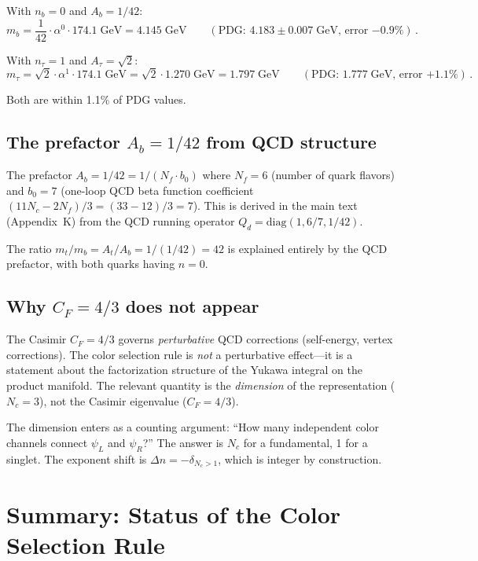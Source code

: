 \documentclass[11pt,a4paper]{article}
\theoremstyle{definition}
\theoremstyle{remark}
\begin{document}
With $n_b = 0$ and $A_b = 1/42$:
\begin{equation}
m_b = \frac{1}{42} \cdot \alpha^0 \cdot 174.1\;\text{GeV}
= 4.145\;\text{GeV}
\qquad (\text{PDG: } 4.183 \pm 0.007\;\text{GeV, error } {-0.9\%})\,.
\end{equation}

With $n_\tau = 1$ and $A_\tau = \sqrt{2}$:
\begin{equation}
m_\tau = \sqrt{2} \cdot \alpha^1 \cdot 174.1\;\text{GeV}
= \sqrt{2} \cdot 1.270\;\text{GeV} = 1.797\;\text{GeV}
\qquad (\text{PDG: } 1.777\;\text{GeV, error } {+1.1\%})\,.
\end{equation}

Both are within 1.1\% of PDG values.

\subsection{The prefactor $A_b = 1/42$ from QCD structure}

The prefactor $A_b = 1/42 = 1/(N_f \cdot b_0)$ where $N_f = 6$
(number of quark flavors) and $b_0 = 7$ (one-loop QCD beta function
coefficient $(11 N_c - 2N_f)/3 = (33-12)/3 = 7$).  This is derived
in the main text (Appendix~K) from the QCD running operator
$Q_d = \text{diag}(1, 6/7, 1/42)$.

The ratio $m_t/m_b = A_t/A_b = 1/(1/42) = 42$ is explained entirely
by the QCD prefactor, with both quarks having $n = 0$.

\subsection{Why $C_F = 4/3$ does not appear}

The Casimir $C_F = 4/3$ governs \emph{perturbative} QCD corrections
(self-energy, vertex corrections).  The color selection rule is
\emph{not} a perturbative effect---it is a statement about the
factorization structure of the Yukawa integral on the product manifold.
The relevant quantity is the \emph{dimension} of the representation
($N_c = 3$), not the Casimir eigenvalue ($C_F = 4/3$).

The dimension enters as a counting argument: ``How many independent
color channels connect $\psi_L$ and $\psi_R$?''  The answer is
$N_c$ for a fundamental, 1 for a singlet.  The exponent shift is
$\Delta n = -\delta_{N_c > 1}$, which is integer by construction.

\section{Summary: Status of the Color Selection Rule}
\label{sec:summary}
\end{document}
